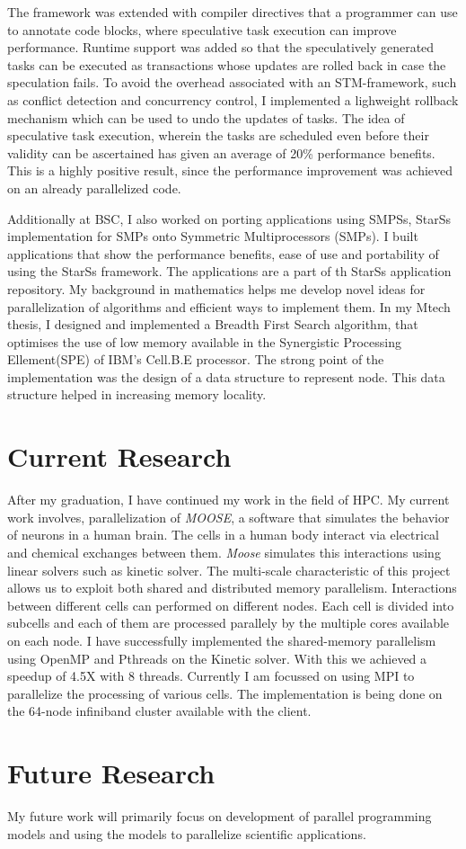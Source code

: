 \documentclass{article}
\begin{document}
The framework was extended with compiler directives that a programmer can use to annotate code blocks, where speculative task execution can improve performance.
Runtime support was added so that the speculatively generated tasks can be executed as transactions whose updates are rolled back in case the speculation fails.
To avoid the overhead associated with an STM-framework, such as conflict detection and concurrency control, I implemented a lighweight rollback mechanism which can be used to undo the updates of tasks. 
The idea of speculative task execution, wherein the tasks are scheduled even before their validity can be ascertained has given an average of 20\% performance benefits. 
This is a highly positive result, since the performance improvement was achieved on an already parallelized code. 
%
\par
Additionally at BSC, I also worked on porting applications using SMPSs, StarSs implementation for SMPs onto Symmetric Multiprocessors (SMPs).
I built applications that show the performance benefits, ease of use and portability of using the StarSs framework. 
The applications are a part of th StarSs application repository. 
My background in mathematics helps me develop novel ideas for parallelization of algorithms and efficient ways to implement them. 
In my Mtech thesis, I designed and implemented a Breadth First Search algorithm, that optimises the use of low memory available in the Synergistic Processing Ellement(SPE) of IBM's Cell.B.E processor. 
The strong point of the implementation was the design of a data structure to represent node. This data structure helped in increasing memory locality. 

\section {Current Research}
After my graduation, I have continued my work in the field of HPC.
My current work involves, parallelization of \textit{MOOSE}, a software that simulates the behavior of neurons in a human brain.
The cells in a human body interact via electrical and chemical exchanges between them. 
\textit{Moose} simulates this interactions using linear solvers such as kinetic solver.
The multi-scale characteristic of this project allows us to exploit both shared and distributed memory parallelism. 
Interactions between different cells can performed on different nodes. 
Each cell is divided into subcells and each of them are processed parallely by the multiple cores available on each node.
I have successfully implemented the shared-memory parallelism using OpenMP and Pthreads on the Kinetic solver. 
With this we achieved a speedup of 4.5X with 8 threads.
Currently I am focussed on using MPI to parallelize the processing of various cells. 
The implementation is being done on the 64-node infiniband cluster available with the client.

%
\section{Future Research}
My future work will primarily focus on development of parallel programming models and using the models to parallelize scientific applications.
\end{document}
